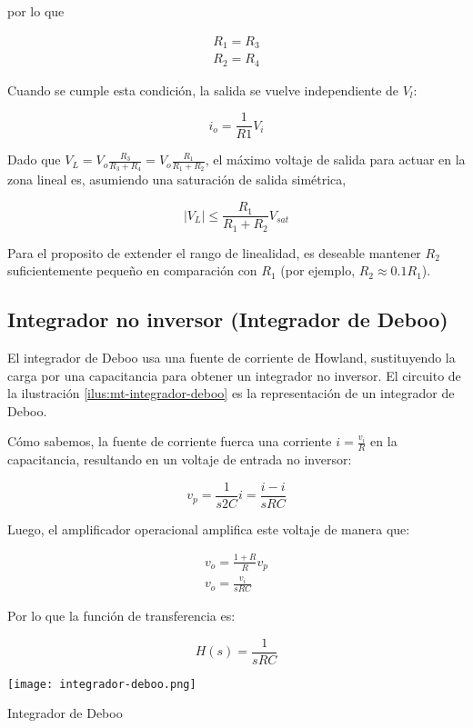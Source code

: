 por lo que 

\begin{align}
    \boxed{R_1 = R_3} \\
    \boxed{R_2 = R_4} 
\end{align}

Cuando se cumple esta condición, la salida se vuelve independiente de $V_l$:

\begin{equation}
    \boxed{i_o = \frac{1}{R1} V_i}
    \label{eq:mt-io-fuente-corriente}
\end{equation}

Dado que $V_L = V_o \frac{R_3}{R_3 + R_4} = V_o \frac{R_1}{R_1 + R_2}$, el máximo  voltaje de salida para actuar en la zona lineal es, asumiendo una saturación de salida simétrica,  

\begin{equation}
    \left| V_L \right| \leq  \frac{R_1}{R_1 + R_2} V_{sat}
\end{equation}

Para el proposito de extender el rango de linealidad, es deseable mantener $R_2$ suficientemente pequeño en comparación	con $R_1$ (por ejemplo, $R_2 \approx 0.1 R_1$).

\subsection{Integrador no inversor (Integrador de Deboo)}

El integrador de Deboo usa una fuente de corriente de Howland, sustituyendo la carga por una capacitancia para obtener un integrador no inversor. El circuito de la ilustración \ref{ilus:mt-integrador-deboo} es la representación de un integrador de Deboo.

Cómo sabemos, la fuente de corriente fuerca una corriente $i = \frac{v_i}{R}$ en la capacitancia, resultando en un voltaje de entrada no inversor:

\begin{equation*}
    v_p = \frac{1}{s2C} i = \frac{i-i}{sRC}
\end{equation*}

Luego, el amplificador operacional amplifica este voltaje de manera que:

\begin{align*}
    v_o = \frac{1 + R}{R} v_p \\
    v_o = \frac{v_i}{sRC}
\end{align*}

Por lo que la función de transferencia es: 

\begin{equation}
    H(s) = \frac{1}{sRC}
    \label{eq:mt-func-transferencia-integrador-deboo}
\end{equation}

\begin{ilustracion}[ht]
    \centering
    \texttt{[image: integrador-deboo.png]}
    \caption{Integrador de Deboo}
    \label{ilus:mt-integrador-deboo}
\end{ilustracion}


